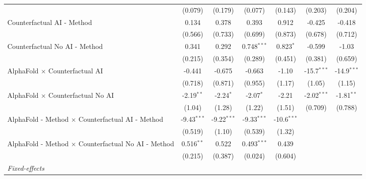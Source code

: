 \begin{tabular}{lcccccc}
                                                              & (0.079)       & (0.179)       & (0.077)       & (0.143)       & (0.203)       & (0.204)\\   
   Counterfactual AI - Method                                 & 0.134         & 0.378         & 0.393         & 0.912         & -0.425        & -0.418\\   
                                                              & (0.566)       & (0.733)       & (0.699)       & (0.873)       & (0.678)       & (0.712)\\   
   Counterfactual No AI - Method                              & 0.341         & 0.292         & 0.748$^{***}$ & 0.823$^{*}$   & -0.599        & -1.03\\   
                                                              & (0.215)       & (0.354)       & (0.289)       & (0.451)       & (0.381)       & (0.659)\\   
   AlphaFold $\times$ Counterfactual AI                       & -0.441        & -0.675        & -0.663        & -1.10         & -15.7$^{***}$ & -14.9$^{***}$\\   
                                                              & (0.718)       & (0.871)       & (0.955)       & (1.17)        & (1.05)        & (1.15)\\   
   AlphaFold $\times$ Counterfactual No AI                    & -2.19$^{**}$  & -2.24$^{*}$   & -2.07$^{*}$   & -2.21         & -2.02$^{***}$ & -1.81$^{**}$\\   
                                                              & (1.04)        & (1.28)        & (1.22)        & (1.51)        & (0.709)       & (0.788)\\   
   AlphaFold - Method $\times$ Counterfactual AI - Method     & -9.43$^{***}$ & -9.22$^{***}$ & -9.33$^{***}$ & -10.6$^{***}$ &               &   \\   
                                                              & (0.519)       & (1.10)        & (0.539)       & (1.32)        &               &   \\   
   AlphaFold - Method $\times$ Counterfactual No AI - Method  & 0.516$^{**}$  & 0.522         & 0.493$^{***}$ & 0.439         &               &   \\   
                                                              & (0.215)       & (0.387)       & (0.024)       & (0.604)       &               &   \\   
   \midrule
   \emph{Fixed-effects}\\

\end{tabular}
